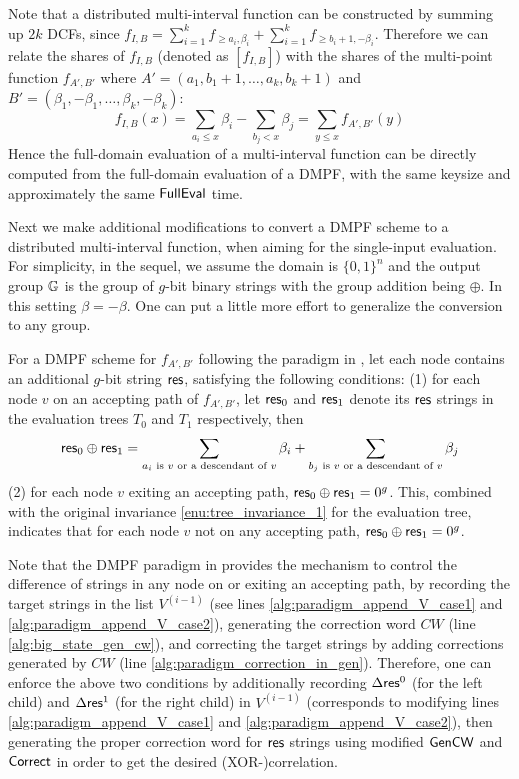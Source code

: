 Note that a distributed multi-interval function can be constructed by summing up $2k$ DCFs, since $f_{I,B} = \sum_{i=1}^k f_{\ge a_i,\beta_i} + \sum_{i=1}^k f_{\ge b_i+1, -\beta_i}$. Therefore we can relate the shares of $f_{I,B}$ (denoted as $[f_{I,B}]$) with the shares of the multi-point function $f_{A',B'}$ where $A' = (a_1,b_1+1,\dots,a_k,b_k+1)$ and $B' = (\beta_1,-\beta_1,\dots,\beta_k,-\beta_k)$: 
\[
  f_{I,B}(x)  = \sum_{a_i\le x}\beta_i - \sum_{b_j<x}\beta_j = \sum_{y\le x}f_{A',B'}(y)
\]
Hence the full-domain evaluation of a multi-interval function can be directly computed from the full-domain evaluation of a DMPF, with the same keysize and approximately the same ${\sf FullEval}$ time. 

Next we make additional modifications to convert a DMPF scheme to a distributed multi-interval function, when aiming for the single-input evaluation. For simplicity, in the sequel, we assume the domain is $\{0,1\}^n$ and the output group $\mathbb{G}$ is the group of $g$-bit binary strings with the group addition being $\oplus$. In this setting $\beta = -\beta$. One can put a little more effort to generalize the conversion to any group. 

For a DMPF scheme for $f_{A',B'}$ following the paradigm in , let each node contains an additional $g$-bit string ${\sf res}$, satisfying the following conditions: (1) for each node $v$ on an accepting path of $f_{A',B'}$, let ${\sf res}_0$ and ${\sf res}_1$ denote its ${\sf res}$ strings in the evaluation trees $T_0$ and $T_1$ respectively, then 
\[
  {\sf res}_0\oplus {\sf res}_1 = \sum_{a_i\text{ is }v\text{ or a descendant of }v}\beta_i + \sum_{b_j\text{ is }v\text{ or a descendant of }v}\beta_j 
\]
(2) for each node $v$ exiting an accepting path, ${\sf res}_0\oplus {\sf res}_1 = 0^g$. This, combined with the original invariance \ref{enu:tree_invariance_1} for the evaluation tree, indicates that for each node $v$ not on any accepting path, ${\sf res}_0\oplus {\sf res}_1 = 0^g$. 

Note that the DMPF paradigm in  provides the mechanism to control the difference of strings in any node on or exiting an accepting path, by recording the target strings in the list $V^{(i-1)}$ (see lines \ref{alg:paradigm_append_V_case1} and \ref{alg:paradigm_append_V_case2}), generating the correction word $CW$ (line \ref{alg:big_state_gen_cw}), and correcting the target strings by adding corrections generated by $CW$ (line \ref{alg:paradigm_correction_in_gen}). Therefore, one can enforce the above two conditions by additionally recording $\Delta{\sf res}^0$ (for the left child) and $\Delta {\sf res}^1$ (for the right child) in $V^{(i-1)}$ (corresponds to modifying lines \ref{alg:paradigm_append_V_case1} and \ref{alg:paradigm_append_V_case2}), then generating the proper correction word for ${\sf res}$ strings using  modified ${\sf Gen}{\sf CW}$ and ${\sf Correct}$ in order to get the desired (XOR-)correlation. 

